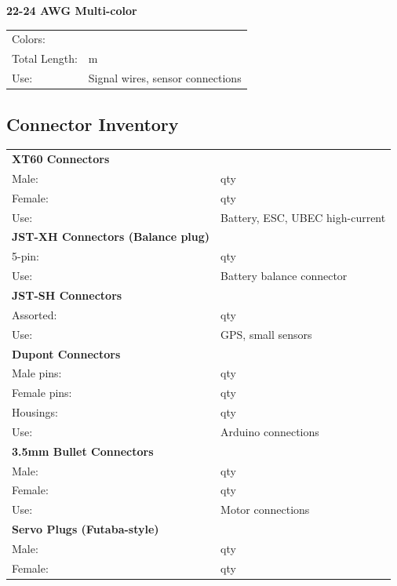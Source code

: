 \documentclass[10pt,letterpaper]{article}
\begin{document}
\textbf{22-24 AWG Multi-color}
\begin{tabularx}{\textwidth}{lX}
Colors: & \underline{\hspace{8cm}} \\
Total Length: & \underline{\hspace{3cm}} m \\
Use: & Signal wires, sensor connections \\
\end{tabularx}

\subsection*{Connector Inventory}

\begin{tabularx}{\textwidth}{lX}
\textbf{XT60 Connectors} & \\
Male: & \underline{\hspace{2cm}} qty \\
Female: & \underline{\hspace{2cm}} qty \\
Use: & Battery, ESC, UBEC high-current \\[1em]

\textbf{JST-XH Connectors (Balance plug)} & \\
5-pin: & \underline{\hspace{2cm}} qty \\
Use: & Battery balance connector \\[1em]

\textbf{JST-SH Connectors} & \\
Assorted: & \underline{\hspace{2cm}} qty \\
Use: & GPS, small sensors \\[1em]

\textbf{Dupont Connectors} & \\
Male pins: & \underline{\hspace{2cm}} qty \\
Female pins: & \underline{\hspace{2cm}} qty \\
Housings: & \underline{\hspace{2cm}} qty \\
Use: & Arduino connections \\[1em]

\textbf{3.5mm Bullet Connectors} & \\
Male: & \underline{\hspace{2cm}} qty \\
Female: & \underline{\hspace{2cm}} qty \\
Use: & Motor connections \\[1em]

\textbf{Servo Plugs (Futaba-style)} & \\
Male: & \underline{\hspace{2cm}} qty \\
Female: & \underline{\hspace{2cm}} qty \\
\end{tabularx}
\end{document}

